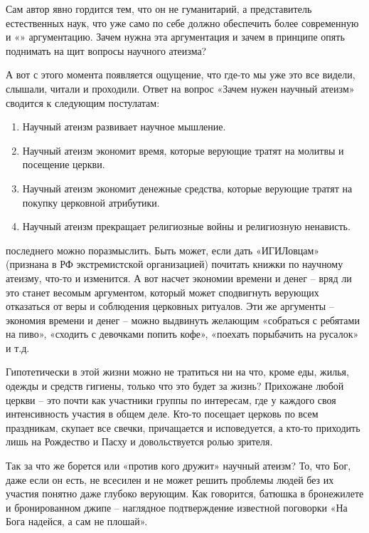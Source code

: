 Сам автор явно гордится тем, что он не гуманитарий, а представитель естественных наук, что уже само по себе должно обеспечить более современную и «» аргументацию. Зачем нужна эта аргументация и зачем в принципе опять поднимать на щит вопросы научного атеизма?

А вот с этого момента появляется ощущение, что где-то мы уже это все видели, слышали, читали и проходили. Ответ на вопрос «Зачем нужен научный атеизм» сводится к следующим постулатам:
\begin{enumerate}
    \item Научный атеизм развивает научное мышление.
    \item Научный атеизм экономит время, которые верующие тратят на молитвы и посещение церкви.
    \item Научный атеизм экономит денежные средства, которые верующие тратят на покупку церковной атрибутики.
    \item Научный атеизм прекращает религиозные войны и религиозную ненависть.
\end{enumerate}

 последнего можно поразмыслить. Быть может, если дать «ИГИЛовцам» (признана в РФ экстремистской организацией) почитать книжки по научному атеизму, что-то и изменится. А вот насчет экономии времени и денег – вряд ли это станет весомым аргументом, который может сподвигнуть верующих отказаться от веры и соблюдения церковных ритуалов. Эти же аргументы – экономия времени и денег – можно выдвинуть желающим «собраться с ребятами на пиво», «сходить с девочками попить кофе», «поехать порыбачить на русалок» и т.д.

Гипотетически в этой жизни можно не тратиться ни на что, кроме еды, жилья, одежды и средств гигиены, только что это будет за жизнь? Прихожане любой церкви – это почти как участники группы по интересам, где у каждого своя интенсивность участия в общем деле. Кто-то посещает церковь по всем праздникам, скупает все свечки, причащается и исповедуется, а кто-то приходить лишь на Рождество и Пасху и довольствуется ролью зрителя.

Так за что же борется или «против кого дружит» научный атеизм? То, что Бог, даже если он есть, не всесилен и не может решить проблемы людей без их участия понятно даже глубоко верующим. Как говорится, батюшка в бронежилете и бронированном джипе – наглядное подтверждение известной поговорки «На Бога надейся, а сам не плошай».

